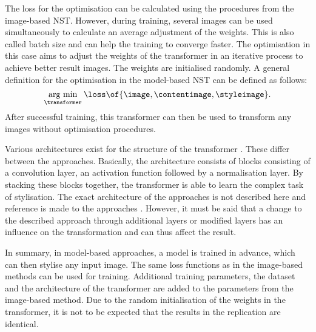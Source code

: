 The loss for the optimisation can be calculated using the procedures from the image-based \gls{NST}. However, during training, several images can be used simultaneously to calculate an average adjustment of the weights. This is also called batch size and can help the training to converge faster. The optimisation in this case aims to adjust the weights of the transformer in an iterative process to achieve better result images. The weights are initialised randomly. A general definition for the optimisation in the model-based \gls{NST} can be defined as follows:
\begin{equation*}
	\argmin{\transformer}{\loss\of{\image\eqcommasep \contentimage\eqcommasep \styleimage}} \eqtextdot
\end{equation*} 
After successful training, this transformer can then be used to transform any images without optimisation procedures.

Various architectures exist for the structure of the transformer \transformer{}. These differ between the approaches. Basically, the architecture consists of blocks consisting of a convolution layer, an activation function followed by a normalisation layer. By stacking these blocks together, the transformer is able to learn the complex task of stylisation. The exact architecture of the approaches is not described here and reference is made to the approaches \cite{JAL2016,ULVL2016,UVL2017,SKLO2018}. However, it must be said that a change to the described approach through additional layers or modified layers has an influence on the transformation and can thus affect the result.

In summary, in model-based approaches, a model is trained in advance, which can then stylise any input image. The same loss functions as in the image-based methods can be used for training. Additional training parameters, the dataset and the architecture of the transformer are added to the parameters from the image-based method. Due to the random initialisation of the weights in the transformer, it is not to be expected that the results in the replication are identical.